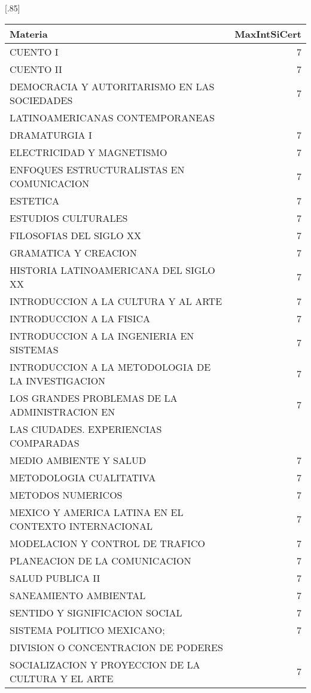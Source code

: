 \documentclass[12pt]{article}
\begin{document}
\begin{table}[ht]
\centering
\scalebox{0.75}[.85]{
\begin{tabular}{lr}
  \hline
  Materia & MaxIntSiCert \\ 
  \hline
  CUENTO I & 7 \\ 
  CUENTO II & 7 \\ 
  DEMOCRACIA Y AUTORITARISMO EN LAS SOCIEDADES & 7 \\ 
   LATINOAMERICANAS CONTEMPORANEAS & \\ 
  DRAMATURGIA I & 7 \\ 
  ELECTRICIDAD Y MAGNETISMO & 7 \\ 
  ENFOQUES ESTRUCTURALISTAS EN COMUNICACION & 7 \\ 
  ESTETICA & 7 \\ 
  ESTUDIOS CULTURALES & 7 \\ 
  FILOSOFIAS DEL SIGLO XX & 7 \\ 
  GRAMATICA Y CREACION & 7 \\ 
  HISTORIA LATINOAMERICANA DEL SIGLO XX & 7 \\ 
  INTRODUCCION A LA CULTURA Y AL ARTE & 7 \\ 
  INTRODUCCION A LA FISICA & 7 \\ 
  INTRODUCCION A LA INGENIERIA EN SISTEMAS & 7 \\ 
  INTRODUCCION A LA METODOLOGIA DE LA INVESTIGACION & 7 \\ 
  LOS GRANDES PROBLEMAS DE LA ADMINISTRACION EN & 7 \\ 
   LAS CIUDADES. EXPERIENCIAS COMPARADAS &  \\ 
  MEDIO AMBIENTE Y SALUD & 7 \\ 
  METODOLOGIA CUALITATIVA & 7 \\ 
  METODOS NUMERICOS & 7 \\ 
  MEXICO Y AMERICA LATINA EN EL CONTEXTO INTERNACIONAL & 7 \\ 
  MODELACION Y CONTROL DE TRAFICO & 7 \\ 
  PLANEACION DE LA COMUNICACION & 7 \\ 
  SALUD PUBLICA II & 7 \\ 
  SANEAMIENTO AMBIENTAL & 7 \\ 
  SENTIDO Y SIGNIFICACION SOCIAL & 7 \\ 
  SISTEMA POLITICO MEXICANO; & 7 \\ 
   DIVISION O CONCENTRACION DE PODERES &  \\ 
  SOCIALIZACION Y PROYECCION DE LA CULTURA Y EL ARTE & 7 \\ 

\end{tabular}}
\end{table}
\end{document}
